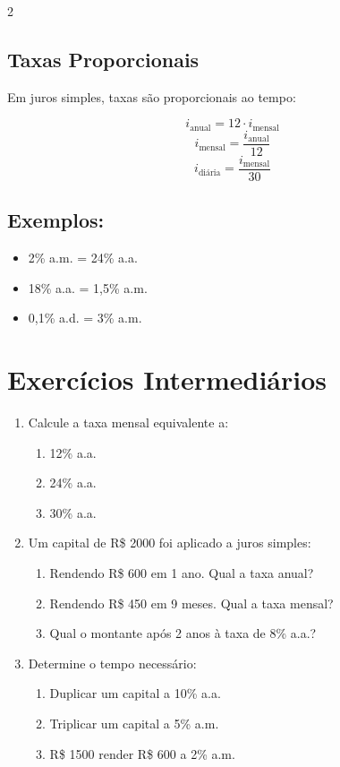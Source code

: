 \documentclass[11pt]{article}
\begin{document}
\begin{multicols}{2}
\subsection*{Taxas Proporcionais}
Em juros simples, taxas são proporcionais ao tempo:

\[
i_{\text{anual}} = 12 \cdot i_{\text{mensal}}
\]
\[
i_{\text{mensal}} = \frac{i_{\text{anual}}}{12}
\]
\[
i_{\text{diária}} = \frac{i_{\text{mensal}}}{30}
\]

\subsection*{Exemplos:}
\begin{itemize}
\item 2\% a.m. = 24\% a.a.
\item 18\% a.a. = 1,5\% a.m.
\item 0,1\% a.d. = 3\% a.m.
\end{itemize}

\section*{Exercícios Intermediários}

\begin{enumerate}[leftmargin=*, start=5]

\item Calcule a taxa mensal equivalente a:
\begin{enumerate}[label=\alph*)]
\item 12\% a.a.
\item 24\% a.a.
\item 30\% a.a.
\end{enumerate}

\item Um capital de R\$ 2000 foi aplicado a juros simples:
\begin{enumerate}[label=\alph*)]
\item Rendendo R\$ 600 em 1 ano. Qual a taxa anual?
\item Rendendo R\$ 450 em 9 meses. Qual a taxa mensal?
\item Qual o montante após 2 anos à taxa de 8\% a.a.?
\end{enumerate}

\item Determine o tempo necessário:
\begin{enumerate}[label=\alph*)]
\item Duplicar um capital a 10\% a.a.
\item Triplicar um capital a 5\% a.m.
\item R\$ 1500 render R\$ 600 a 2\% a.m.
\end{enumerate}


\end{enumerate}
\end{multicols}
\end{document}
